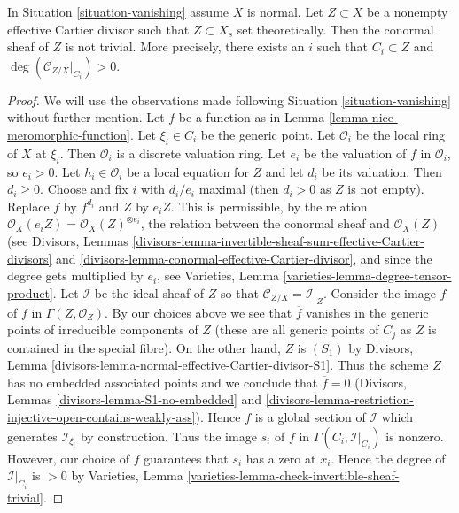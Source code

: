 \begin{lemma}
\label{lemma-nontrivial-normal-bundle}
In Situation \ref{situation-vanishing} assume $X$ is normal.
Let $Z \subset X$ be a nonempty effective Cartier divisor such that
$Z \subset X_s$ set theoretically.
Then the conormal sheaf of $Z$ is not trivial.
More precisely, there exists an $i$ such that $C_i \subset Z$
and $\deg(\mathcal{C}_{Z/X}|_{C_i}) > 0$.
\end{lemma}

\begin{proof}
We will use the observations made following Situation \ref{situation-vanishing}
without further mention. Let $f$ be a function as in
Lemma \ref{lemma-nice-meromorphic-function}.
Let $\xi_i \in C_i$ be the generic point. Let
$\mathcal{O}_i$ be the local ring of $X$ at $\xi_i$. Then $\mathcal{O}_i$
is a discrete valuation ring. Let $e_i$ be the valuation of
$f$ in $\mathcal{O}_i$, so $e_i > 0$. Let $h_i \in \mathcal{O}_i$ be a local
equation for $Z$ and let $d_i$ be its valuation. Then $d_i \geq 0$.
Choose and fix $i$ with $d_i/e_i$ maximal (then $d_i > 0$ as
$Z$ is not empty). Replace $f$ by $f^{d_i}$ and $Z$ by $e_iZ$.
This is permissible, by the relation
$\mathcal{O}_X(e_i Z) = \mathcal{O}_X(Z)^{\otimes e_i}$,
the relation between the conormal sheaf and $\mathcal{O}_X(Z)$
(see Divisors, Lemmas
\ref{divisors-lemma-invertible-sheaf-sum-effective-Cartier-divisors}
and \ref{divisors-lemma-conormal-effective-Cartier-divisor}, and
since the degree gets multiplied by $e_i$, see
Varieties, Lemma \ref{varieties-lemma-degree-tensor-product}.
Let $\mathcal{I}$ be the ideal sheaf of $Z$ so that
$\mathcal{C}_{Z/X} = \mathcal{I}|_Z$. Consider the image $\overline{f}$
of $f$ in $\Gamma(Z, \mathcal{O}_Z)$. By our choices above we see
that $\overline{f}$ vanishes in the generic points of irreducible
components of $Z$ (these are all generic points of $C_j$ as $Z$ is
contained in the special fibre). On the other hand, $Z$ is $(S_1)$ by
Divisors, Lemma \ref{divisors-lemma-normal-effective-Cartier-divisor-S1}.
Thus the scheme $Z$ has no embedded associated points and
we conclude that $\overline{f} = 0$ (Divisors, Lemmas
\ref{divisors-lemma-S1-no-embedded} and
\ref{divisors-lemma-restriction-injective-open-contains-weakly-ass}).
Hence $f$ is a global section of $\mathcal{I}$
which generates $\mathcal{I}_{\xi_i}$ by construction.
Thus the image $s_i$ of $f$ in $\Gamma(C_i, \mathcal{I}|_{C_i})$ is nonzero.
However, our choice of $f$ guarantees that $s_i$ has a zero at $x_i$.
Hence the degree of $\mathcal{I}|_{C_i}$ is $> 0$ by
Varieties, Lemma \ref{varieties-lemma-check-invertible-sheaf-trivial}.
\end{proof}

